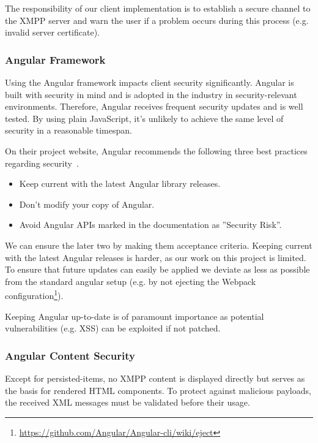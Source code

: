 The responsibility of our client implementation is to establish a secure channel to the XMPP server and warn the user if a problem occurs during this process (e.g. invalid server certificate).

\subsubsection{Angular Framework}

Using the Angular framework impacts client security significantly.
Angular is built with security in mind and is adopted in the industry in security-relevant environments.
Therefore, Angular receives frequent security updates and is well tested.
By using plain JavaScript, it's unlikely to achieve the same level of security in a reasonable timespan.

On their project website, Angular recommends the following three best practices regarding security~\cite{angular-security}.

\begin{itemize}
    \item Keep current with the latest Angular library releases.
    \item Don't modify your copy of Angular.
    \item Avoid Angular APIs marked in the documentation as ''Security Risk''.
\end{itemize}

We can ensure the later two by making them acceptance criteria.
Keeping current with the latest Angular releases is harder, as our work on this project is limited.
To ensure that future updates can easily be applied we deviate as less as possible from the standard angular setup (e.g. by not ejecting the Webpack configuration\footnote{\url{https://github.com/Angular/Angular-cli/wiki/eject}}).

Keeping Angular up-to-date is of paramount importance as potential vulnerabilities (e.g. XSS) can be exploited if not patched.

\subsubsection{Angular Content Security}

Except for \glspl{persisted-item}, no XMPP content is displayed directly but serves as the basis for rendered HTML components.
To protect against malicious payloads, the received XML messages must be validated before their usage.

